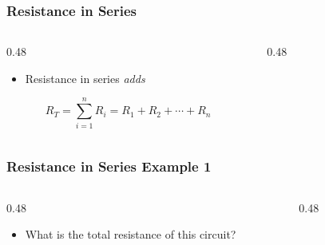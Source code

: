 \begin{frame}
    \frametitle{Resistance in Series}
	\begin{columns}
        \begin{column}{0.48\linewidth}
            \begin{itemize}
                \item Resistance in series \emph{adds}
            \end{itemize}
            \[
                R_T=\sum_{i=1}^{n}R_i=R_1+R_2+\cdots+R_n
            \]
        \end{column}
        \begin{column}{0.48\linewidth}
            \begin{figure}
                \centering
                \resizebox{\columnwidth}{!}{
                    
                }
            \end{figure}
        \end{column}
	\end{columns}
\end{frame}

\begin{frame}
    \frametitle{Resistance in Series Example 1}
	\begin{columns}
        \begin{column}{0.48\linewidth}
            \begin{itemize}
                \item What is the total resistance of this circuit?
            \end{itemize}
        \end{column}
        \begin{column}{0.48\linewidth}
            \begin{figure}
                \centering
                \resizebox{\columnwidth}{!}{
                    
                }
            \end{figure}
        \end{column}
	\end{columns}
\end{frame}

